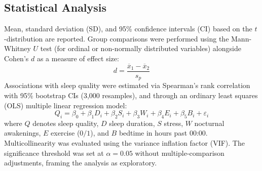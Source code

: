 \documentclass[conference]{IEEEtran}
\begin{document}
\subsection{Statistical Analysis}
Mean, standard deviation (SD), and 95\% confidence intervals (CI) based on the $t$-distribution are reported. Group comparisons were performed using the Mann-Whitney $U$ test (for ordinal or non-normally distributed variables) alongside Cohen's $d$ as a measure of effect size:
\begin{equation}
d = \frac{\overline{x}_1 - \overline{x}_2}{s_p}
\end{equation}
Associations with sleep quality were estimated via Spearman's rank correlation with 95\% bootstrap CIs (3,000 resamples), and through an ordinary least squares (OLS) multiple linear regression model:
\begin{equation}
Q_i = \beta_0 + \beta_1 D_i + \beta_2 S_i + \beta_3 W_i + \beta_4 E_i + \beta_5 B_i + \varepsilon_i
\end{equation}
where $Q$ denotes sleep quality, $D$ sleep duration, $S$ stress, $W$ nocturnal awakenings, $E$ exercise ($0/1$), and $B$ bedtime in hours past 00:00. Multicollinearity was evaluated using the variance inflation factor (VIF). The significance threshold was set at $\alpha=0.05$ without multiple-comparison adjustments, framing the analysis as exploratory.
\end{document}
